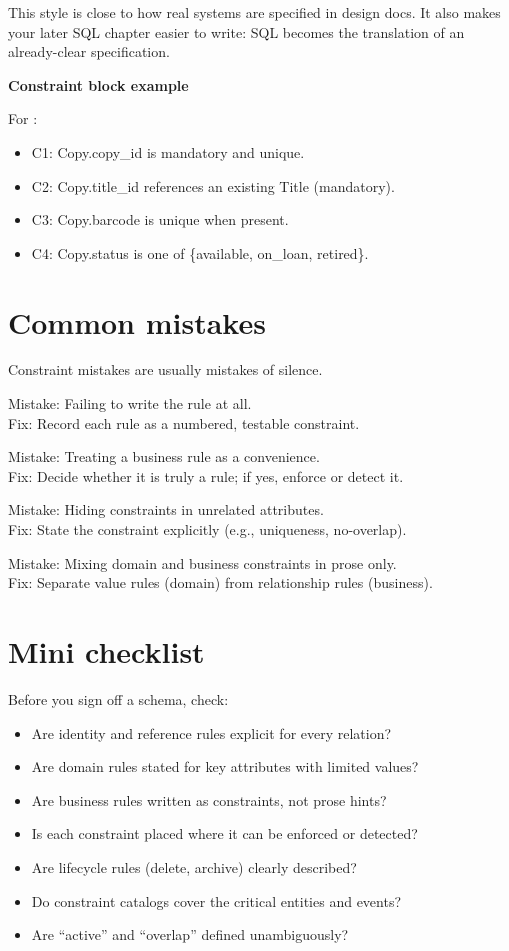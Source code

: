 This style is close to how real systems are specified in design docs.
It also makes your later SQL chapter easier to write: SQL becomes the translation of an already-clear specification.

\begin{examplebox}
\textbf{Constraint block example}\par\smallskip
For :
\begin{itemize}[leftmargin=*,nosep]
  \item C1: Copy.copy\_id is mandatory and unique.
  \item C2: Copy.title\_id references an existing Title (mandatory).
  \item C3: Copy.barcode is unique when present.
  \item C4: Copy.status is one of \{available, on\_loan, retired\}.
\end{itemize}
\end{examplebox}

\section{Common mistakes}
Constraint mistakes are usually mistakes of silence.

Mistake: Failing to write the rule at all.\\
Fix: Record each rule as a numbered, testable constraint.

Mistake: Treating a business rule as a convenience.\\
Fix: Decide whether it is truly a rule; if yes, enforce or detect it.

Mistake: Hiding constraints in unrelated attributes.\\
Fix: State the constraint explicitly (e.g., uniqueness, no-overlap).

Mistake: Mixing domain and business constraints in prose only.\\
Fix: Separate value rules (domain) from relationship rules (business).

\section{Mini checklist}
Before you sign off a schema, check:
\begin{itemize}[leftmargin=*,nosep]
  \item Are identity and reference rules explicit for every relation?
  \item Are domain rules stated for key attributes with limited values?
  \item Are business rules written as constraints, not prose hints?
  \item Is each constraint placed where it can be enforced or detected?
  \item Are lifecycle rules (delete, archive) clearly described?
  \item Do constraint catalogs cover the critical entities and events?
  \item Are “active” and “overlap” defined unambiguously?
\end{itemize}

